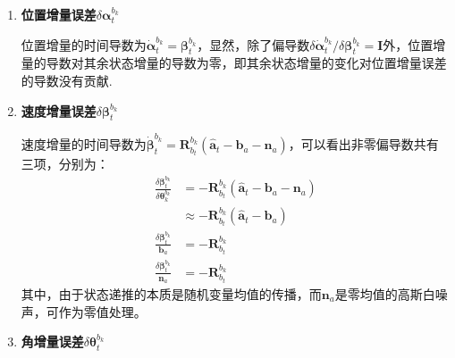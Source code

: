 \begin{enumerate}
	\item \textbf{位置增量误差}$\delta\bm{\alpha}_t^{b_k}$
	
	位置增量的时间导数为$\dot{\bm{\alpha}}_t^{b_k}=\bm{\beta}_t^{b_k}$，显然，除了偏导数$\delta\dot{\bm{\alpha}}_t^{b_k}/\delta\bm{\beta}_t^{b_k}=\bm{I}$外，位置增量的导数对其余状态增量的导数为零，即其余状态增量的变化对位置增量误差的导数没有贡献.
	\item \textbf{速度增量误差}$\delta\bm{\beta}_t^{b_k}$
	
	速度增量的时间导数为$\dot{\bm{\beta}}_t^{b_k}=\bm{R}_{b_t}^{b_k}\left(\hat{\bm{a}}_t-\bm{b}_a-\bm{n}_a\right)$，可以看出非零偏导数共有三项，分别为：
	\begin{equation}
	\begin{aligned}
	\frac{\delta\bm{\beta}_t^{b_k}}{\delta\bm{\theta}_k^{b_k}}&=-\bm{R}_{b_t}^{b_k}\left(\hat{\bm{a}}_t-\bm{b}_a-\bm{n}_a\right)\\
	&\approx-\bm{R}_{b_t}^{b_k}\left(\hat{\bm{a}}_t-\bm{b}_a\right)\\
	\frac{\delta\bm{\beta}_t^{b_k}}{\bm{b}_a}&=-\bm{R}_{b_t}^{b_k}\\
	\frac{\delta\bm{\beta}_t^{b_k}}{\bm{n}_a}&=-\bm{R}_{b_t}^{b_k}
	\end{aligned}
	\end{equation}
	其中，由于状态递推的本质是随机变量均值的传播，而$\bm{n}_a$是零均值的高斯白噪声，可作为零值处理。
	\item \textbf{角增量误差}$\delta\bm{\theta}_t^{b_k}$
	

\end{enumerate}
